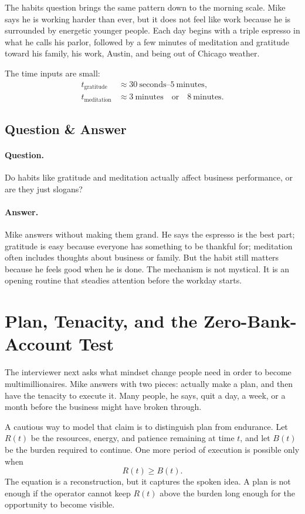 The habits question brings the same pattern down to the morning scale. Mike says he is working harder than ever, but it does not feel like work because he is surrounded by energetic younger people. Each day begins with a triple espresso in what he calls his parlor, followed by a few minutes of meditation and gratitude toward his family, his work, Austin, and being out of Chicago weather.

The time inputs are small:
\begin{align}
t_{\text{gratitude}} &\approx 30\ \text{seconds}\text{--}5\ \text{minutes},\\
t_{\text{meditation}} &\approx 3\ \text{minutes}\quad\text{or}\quad 8\ \text{minutes}.
\end{align}

\subsection{Question \& Answer}

\paragraph{Question.}
Do habits like gratitude and meditation actually affect business performance, or are they just slogans?

\paragraph{Answer.}
Mike answers without making them grand. He says the espresso is the best part; gratitude is easy because everyone has something to be thankful for; meditation often includes thoughts about business or family. But the habit still matters because he feels good when he is done. The mechanism is not mystical. It is an opening routine that steadies attention before the workday starts.

\section{Plan, Tenacity, and the Zero-Bank-Account Test}

The interviewer next asks what mindset change people need in order to become multimillionaires. Mike answers with two pieces: actually make a plan, and then have the tenacity to execute it. Many people, he says, quit a day, a week, or a month before the business might have broken through.

A cautious way to model that claim is to distinguish plan from endurance. Let \(R(t)\) be the resources, energy, and patience remaining at time \(t\), and let \(B(t)\) be the burden required to continue. One more period of execution is possible only when
\begin{equation}
R(t) \geq B(t).
\end{equation}
The equation is a reconstruction, but it captures the spoken idea. A plan is not enough if the operator cannot keep \(R(t)\) above the burden long enough for the opportunity to become visible.

